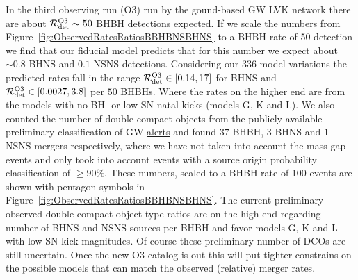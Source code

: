 \documentclass[twocolumn]{aastex63}
\newcommand\rate{\mathcal{R}}
\newcommand\bhnsSingle{BHNS\xspace}
\newcommand{\Nmodels}{\ensuremath{336}\xspace}
\begin{document}
In the third observing run (O3) run by the gound-based \ac{GW} LVK network  there are about $\rate_{\rm{det}}^{\rm{O3}} \sim 50$  \ac{BHBH} detections expected.  If we scale the numbers from Figure~\ref{fig:ObservedRatesRatiosBBHBNSBHNS} to a \ac{BHBH} rate of 50 detection we find that our fiducial model predicts that for this number we expect about  $\sim 0.8 $ \bhnsSingle  and $0.1$ \ac{NSNS}  detections. Considering our \Nmodels model variations the predicted rates fall in the range $ \rate_{\rm{det}}^{\rm{O3}} \in  [0.14, 17]$ for \bhnsSingle and   $ \rate_{\rm{det}}^{\rm{O3}} \in  [0.0027, 3.8]$ per $50$ BHBHs. Where the rates on the higher end are from the models with no \ac{BH}- or low  SN natal kicks (models G, K and L).  
We also counted the number of double compact objects from the publicly available preliminary classification of \ac{GW} \href{http://chirp.sr.bham.ac.uk/alerts}{alerts} and found $37$ BHBH, $3$ \bhnsSingle and $1$ \ac{NSNS} mergers respectively, where we have not taken into account the mass gap events and only took into account events with a source origin probability classification of $\geq 90\%$. These numbers, scaled to a \ac{BHBH} rate of 100 events are shown with pentagon symbols in Figure~\ref{fig:ObservedRatesRatiosBBHBNSBHNS}. The current preliminary observed double compact object type ratios are on the high end regarding number of \bhnsSingle and \ac{NSNS} sources per BHBH and favor models G, K and L with low \ac{SN} kick magnitudes. Of course these preliminary number of \acp{DCO} are still uncertain. Once the new O3 catalog is out this will put tighter constrains on the possible models that can match the observed (relative) merger rates. 




%

\end{document}
